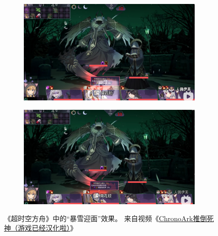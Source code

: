 \documentclass[11pt]{article}
\begin{document}
    \begin{figure}[ht]
        \centering
        \begin{subfigure}{\textwidth}
            \centering
            \includegraphics[width=\textwidth]{./imgs/ChronoArk_snow_1}
            \caption{}
        \end{subfigure}
        \begin{subfigure}{\textwidth}
            \centering
            \includegraphics[width=\textwidth]{./imgs/ChronoArk_snow_2}
            \caption{}
        \end{subfigure}
        \caption{《超时空方舟》中的“暴雪迎面”效果。
        来自视频《\href{https://www.bilibili.com/video/BV1K5411r7cd}{ChronoArk推倒死神（游戏已经汉化啦）}》}
        \label{fig:chronoark-snow}
    \end{figure}
\end{document}
